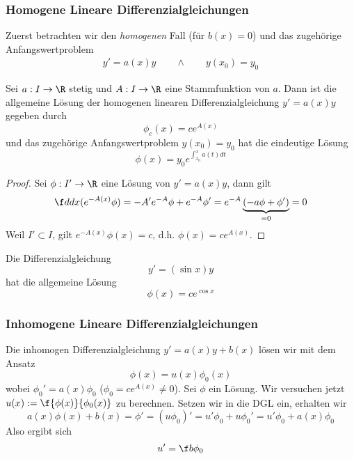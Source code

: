 \documentclass[a4paper,10pt]{scrartcl}
\begin{document}
\subsubsection{Homogene Lineare Differenzialgleichungen}

Zuerst betrachten wir den \emph{homogenen} Fall (für $b(x) = 0$) und das zugehörige Anfangswertproblem
\begin{align*}
	y' = a(x)y \qquad\land\qquad
y(x_0) = y_0
\end{align*}

\begin{st} \label{11.2}
	Sei $a:I \to \R$ stetig und $A:I\to \R$ eine Stammfunktion von $a$.
	Dann ist die allgemeine Lösung der homogenen linearen Differenzialgleichung $y' = a(x) y$ gegeben durch
	\[
		\phi_c (x) = c e^{A(x)}
	\]
	und das zugehörige Anfangswertproblem $y(x_0) = y_0$ hat die eindeutige Lösung
	\[
		\phi(x) = y_0 e^{\int_{x_0}^xa(t)dt}
	\]
	\begin{proof}
		Sei $\phi: I' \to \R$ eine Lösung von $y' = a(x) y$, dann gilt
		\[
			\f d{dx} (e^{-A(x)}\phi) = -A'e^{-A}\phi + e^{-A}\phi' = e^{-A}\underbrace{(-a\phi + \phi')}_{=0} = 0
		\]
		Weil $I'\subset I$, gilt $e^{-A(x)}\phi(x) = c$, d.h. $\phi(x) = c e^{A(x)}$.
	\end{proof}
\end{st}

\begin{ex*}
	Die Differenzialgleichung
	\[
		y' = (\sin x)y
	\]
	hat die allgemeine Lösung
	\[
		\phi(x) = ce^{\cos x}
	\]
\end{ex*}

\subsubsection{Inhomogene Lineare Differenzialgleichungen}

Die inhomogen Differenzialgleichung $y' = a(x)y + b(x)$ lösen wir mit dem Ansatz
\[
	\phi(x) = u(x) \phi_0(x)
\]
wobei $\phi_0' = a(x) \phi_0$ ($\phi_0 = c e^{A(x)}\neq 0$).
Sei $\phi$ ein Lösung.
Wir versuchen jetzt $u(x) := \f {\phi(x)}{\phi_0(x)}$ zu berechnen.
Setzen wir in die DGL ein, erhalten wir
\[
	a(x)\phi(x) + b(x) = \phi' = (u\phi_0)' = u'\phi_0 + u\phi_0' = u'\phi_0 + a(x)\phi_0
\]
Also ergibt sich
\[
	u' = \f b{\phi_0}
\]
\end{document}
